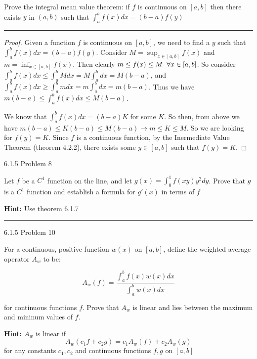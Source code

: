 \documentclass[11pt]{article}
\begin{document}
Prove the integral mean value theorem: if $f$ is continuous on $[a,b]$ then there exists $y$ in $(a,b)$ 
such that $\int_a ^b f(x) dx = (b - a)f(y)$
\hrule


\begin{proof}
    Given a function $f$ is continuous on $[a,b]$, we need to find a $y$ such that $\int_a ^b f(x) dx = (b-a) f(y)$. 
    Consider $M = \sup_{x \in [a,b]}f(x)$ and $m = \inf_{x \in [a,b]}f(x)$. Then clearly $m \leq f(x) \leq M \sp \forall x \in [a,b]$. 
    So consider $\int_a ^b f(x)dx \leq \int_a ^b Mdx = M \int_a ^b dx = M(b - a)$, and $\int_a ^b f(x)dx \geq \int_a ^b mdx = m \int_a ^b dx = m(b - a)$.
    Thus we have $m (b - a) \leq \int_a ^b f(x) dx \leq M (b - a)$.

    We know that $\int_a ^b f(x) dx = (b - a) K$ for some $K$. So then, from above we have $m (b - a) \leq K (b-a) \leq M (b - a) \rightarrow m \leq K \leq M$.
    So we are looking for $f(y) = K$. Since $f$ is a continuous function, by the Inermediate Value Theorem (theorem 4.2.2), there exists some $y \in [a,b]$ such that $f(y) = K$.

\end{proof}





 6.1.5 Problem 8

Let $f$ be a $C^1$ function on the line, and let $g(x) = \int_0 ^1 f(xy)y^2 dy$.
Prove that $g$ is a $C^1$ function and establish a formula for $g'(x)$ in terms of $f$

\textbf{Hint:} Use theorem 6.1.7
\hrule





 6.1.5 Problem 10

For a continuous, positive function $w(x)$ on $[a,b]$, define the weighted average operator $A_w$ to be:

$$A_w(f) = \frac{ \int_a ^b f(x) w(x) dx }{ \int_a ^b w(x) dx}$$

for continuous functions $f$. Prove that $A_w$ is linear and lies between the maximum and mininum values of $f$.

\textbf{Hint:} $A_w$ is linear if
$$A_w (c_1 f + c_2 g) = c_1 A_w (f) + c_2 A_w (g)$$
for any constants $c_1, c_2$ and continuous functions $f,g$ on $[a,b]$
\end{document}
